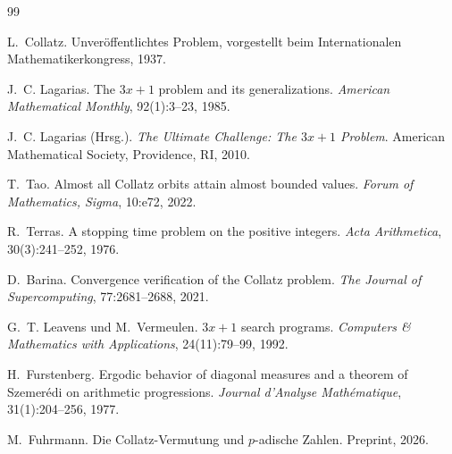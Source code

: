 \documentclass[12pt,a4paper]{article}
\begin{document}
\begin{thebibliography}{99}

L.~Collatz.
\newblock Unveröffentlichtes Problem, vorgestellt beim Internationalen Mathematikerkongress, 1937.

J.~C. Lagarias.
\newblock The $3x+1$ problem and its generalizations.
\newblock \emph{American Mathematical Monthly}, 92(1):3--23, 1985.

J.~C. Lagarias (Hrsg.).
\newblock \emph{The Ultimate Challenge: The $3x+1$ Problem}.
\newblock American Mathematical Society, Providence, RI, 2010.

T.~Tao.
\newblock Almost all Collatz orbits attain almost bounded values.
\newblock \emph{Forum of Mathematics, Sigma}, 10:e72, 2022.

R.~Terras.
\newblock A stopping time problem on the positive integers.
\newblock \emph{Acta Arithmetica}, 30(3):241--252, 1976.

D.~Barina.
\newblock Convergence verification of the Collatz problem.
\newblock \emph{The Journal of Supercomputing}, 77:2681--2688, 2021.

G.~T. Leavens und M.~Vermeulen.
\newblock $3x+1$ search programs.
\newblock \emph{Computers \& Mathematics with Applications}, 24(11):79--99, 1992.

H.~Furstenberg.
\newblock Ergodic behavior of diagonal measures and a theorem of Szemer\'edi on arithmetic progressions.
\newblock \emph{Journal d'Analyse Math\'ematique}, 31(1):204--256, 1977.

M.~Fuhrmann.
\newblock Die Collatz-Vermutung und $p$-adische Zahlen.
\newblock Preprint, 2026.

\end{thebibliography}
\end{document}
